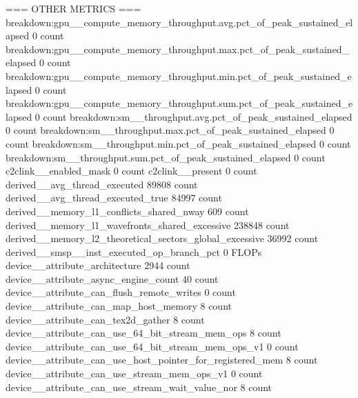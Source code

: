 
=== OTHER METRICS ===
breakdown:gpu__compute_memory_throughput.avg.pct_of_peak_sustained_elapsed                     0 count
breakdown:gpu__compute_memory_throughput.max.pct_of_peak_sustained_elapsed                     0 count
breakdown:gpu__compute_memory_throughput.min.pct_of_peak_sustained_elapsed                     0 count
breakdown:gpu__compute_memory_throughput.sum.pct_of_peak_sustained_elapsed                     0 count
breakdown:sm__throughput.avg.pct_of_peak_sustained_elapsed                                     0 count
breakdown:sm__throughput.max.pct_of_peak_sustained_elapsed                                     0 count
breakdown:sm__throughput.min.pct_of_peak_sustained_elapsed                                     0 count
breakdown:sm__throughput.sum.pct_of_peak_sustained_elapsed                                     0 count
c2clink__enabled_mask                                                                          0 count
c2clink__present                                                                               0 count
derived__avg_thread_executed                                                               89808 count
derived__avg_thread_executed_true                                                          84997 count
derived__memory_l1_conflicts_shared_nway                                                     609 count
derived__memory_l1_wavefronts_shared_excessive                                            238848 count
derived__memory_l2_theoretical_sectors_global_excessive                                    36992 count
derived__smsp__inst_executed_op_branch_pct                                                     0 FLOPs
device__attribute_architecture                                                              2944 count
device__attribute_async_engine_count                                                          40 count
device__attribute_can_flush_remote_writes                                                      0 count
device__attribute_can_map_host_memory                                                          8 count
device__attribute_can_tex2d_gather                                                             8 count
device__attribute_can_use_64_bit_stream_mem_ops                                                8 count
device__attribute_can_use_64_bit_stream_mem_ops_v1                                             0 count
device__attribute_can_use_host_pointer_for_registered_mem                                      8 count
device__attribute_can_use_stream_mem_ops_v1                                                    0 count
device__attribute_can_use_stream_wait_value_nor                                                8 count
